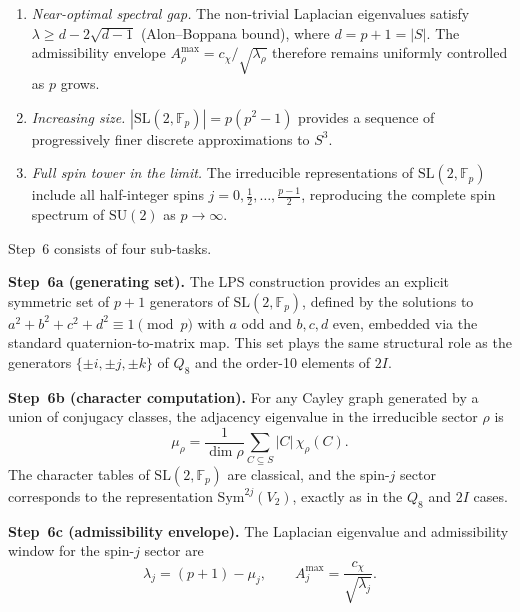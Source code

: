 \documentclass[11pt,a4paper]{article}
\begin{document}
    \begin{enumerate}
      \item \emph{Near-optimal spectral gap.}
      The non-trivial Laplacian eigenvalues satisfy
      $\lambda \ge d - 2\sqrt{d-1}$ (Alon--Boppana bound),
      where $d = p + 1 = |S|$.
      The admissibility envelope
      $A^{\max}_\rho = c_\chi/\sqrt{\lambda_\rho}$ therefore remains
      uniformly controlled as $p$ grows.

      \item \emph{Increasing size.}
      $|\mathrm{SL}(2,\mathbb{F}_p)| = p(p^2-1)$ provides a sequence of
      progressively finer discrete approximations to $S^3$.

      \item \emph{Full spin tower in the limit.}
      The irreducible representations of $\mathrm{SL}(2,\mathbb{F}_p)$
      include all half-integer spins
      $j = 0, \tfrac12, \ldots, \tfrac{p-1}{2}$,
      reproducing the complete spin spectrum of $\mathrm{SU}(2)$ as
      $p \to \infty$.
    \end{enumerate}

    Step~6 consists of four sub-tasks.

    \medskip
    \noindent\textbf{Step~6a (generating set).}
    The LPS construction provides an explicit symmetric set of $p+1$
    generators of $\mathrm{SL}(2,\mathbb{F}_p)$, defined by the solutions to
    $a^2+b^2+c^2+d^2 \equiv 1 \pmod p$ with $a$ odd and $b,c,d$ even,
    embedded via the standard quaternion-to-matrix map.
    This set plays the same structural role as the generators
    $\{\pm i,\pm j,\pm k\}$ of $Q_8$ and the order-10 elements of $2I$.

    \medskip
    \noindent\textbf{Step~6b (character computation).}
    For any Cayley graph generated by a union of conjugacy classes,
    the adjacency eigenvalue in the irreducible sector $\rho$ is
    \begin{equation}
      \mu_\rho
      =
      \frac{1}{\dim\rho}
      \sum_{C \subseteq S} |C|\,\chi_\rho(C).
      \label{eq:mu-SL2}
    \end{equation}
    The character tables of $\mathrm{SL}(2,\mathbb{F}_p)$ are classical,
    and the spin-$j$ sector corresponds to the representation
    $\mathrm{Sym}^{2j}(V_2)$, exactly as in the $Q_8$ and $2I$ cases.

    \medskip
    \noindent\textbf{Step~6c (admissibility envelope).}
    The Laplacian eigenvalue and admissibility window for the spin-$j$
    sector are
    \begin{equation}
      \lambda_j = (p+1) - \mu_j,
      \qquad
      A^{\max}_j = \frac{c_\chi}{\sqrt{\lambda_j}}.
      \label{eq:Amax-SL2}
    \end{equation}
\end{document}
